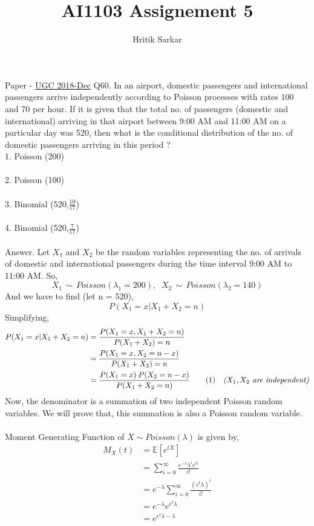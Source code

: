 \documentclass{article}
\title{AI1103 Assignement 5}
\author{Hritik Sarkar}
\theoremstyle{remark}
\newcommand\numberthis{\addtocounter{equation}{1}\tag{\theequation}}
\begin{document}
\maketitle
Paper - \href{https://github.com/gadepall/papers/blob/master/ugc/math/dec-math-set-a-2018.pdf}{UGC 2018-Dec}
\newline
\newline
Q60. In an airport, domestic passengers and international passengers arrive independently according to Poisson processes with rates 100 and 70 per hour. If it is given that the total no. of passengers (domestic and international) arriving in that airport between 9:00 AM and 11:00 AM on a particular day was 520, then what is the conditional distribution of the no. of domestic passengers arriving in this period ?
\newline
\\
1. Poisson (200)\\ \\
2. Poisson (100)\\ \\
3. Binomial (520,$\frac{10}{17}$)\\ \\
4. Binomial (520,$\frac{7}{17}$)\\ \\
Answer. Let $X_1$ and $X_2$ be the random variables representing the no. of arrivals of domestic and international passengers during the time interval 9:00 AM to 11:00 AM. So,
\[
    X_1\,\sim\,Poisson(\lambda_1 = 200),\; \; X_2\,\sim\,Poisson(\lambda_2=140)
\]
And we have to find (let n = 520),
\[
    P(X_1 = x | X_1+X_2 = n) 
\]
Simplifying,
\begin{align*}
    P(X_1 = x | X_1+X_2 = n) &= \frac {P(X_1 = x, X_1+X_2 = n)} {P(X_1+X_2)=n}\\
    &= \frac {P(X_1 = x, X_2 = n-x)}{P(X_1+X_2)=n}\\
    &= \frac{P(X_1=x)\:P(X_2=n-x)}{P(X_1+X_2=n)} \numberthis{\label{1}}&\textit{($X_1,X_2$ are independent)}
\end{align*}
Now, the denominator is a summation of two independent Poisson random variables. We will prove that, this summation is also a Poisson random variable.\\ \\
Moment Generating Function of $X \sim Poisson(\lambda)$ is given by,
\begin{align*}
    M_X(t) &= \mathbb{E}\left [ e^{tX} \right ]\\
    &= \sum_{i=0}^{\infty} \frac{{}e^{-\lambda}\lambda^ie^{ti}}{i!}\\
    &= e^{-\lambda}\sum_{i=0}^{\infty} \frac{{}(e^t\lambda)^{i}}{i!}\\
    &= e^{-\lambda}e^{e^t\lambda}\\
    &= e^{e^t\lambda-\lambda}
\end{align*}
\end{document}
